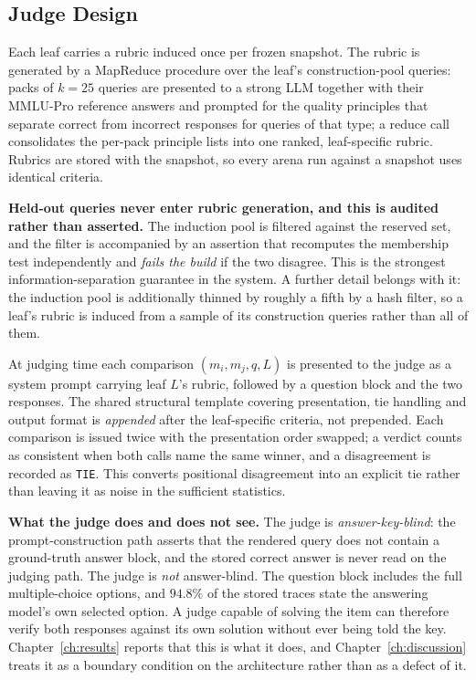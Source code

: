 \subsection{Judge Design}\label{sec:arch-judge}

Each leaf carries a rubric induced once per frozen snapshot. The
rubric is generated by a MapReduce procedure over the leaf's
construction-pool queries: packs of $k = 25$ queries are presented to a
strong LLM together with their MMLU-Pro reference answers and prompted
for the quality principles that separate correct from incorrect
responses for queries of that type; a reduce call consolidates the
per-pack principle lists into one ranked, leaf-specific rubric.
Rubrics are stored with the snapshot, so every arena run against a
snapshot uses identical criteria.

\textbf{Held-out queries never enter rubric generation, and this is
audited rather than asserted.} The induction pool is filtered against
the reserved set, and the filter is accompanied by an assertion that
recomputes the membership test independently and \emph{fails the build}
if the two disagree. This is the strongest information-separation
guarantee in the system. A further detail belongs with it: the
induction pool is additionally thinned by roughly a fifth by a hash
filter, so a leaf's rubric is induced from a sample of its construction
queries rather than all of them.

At judging time each comparison $(m_i, m_j, q, L)$ is presented to the
judge as a system prompt carrying leaf $L$'s rubric, followed by a
question block and the two responses. The shared structural template
covering presentation, tie handling and output format is
\emph{appended} after the leaf-specific criteria, not prepended.
Each comparison is issued twice with the presentation order swapped; a
verdict counts as consistent when both calls name the same winner, and
a disagreement is recorded as \texttt{TIE}. This converts positional
disagreement into an explicit tie rather than leaving it as noise in
the sufficient statistics.

\textbf{What the judge does and does not see.}
The judge is \emph{answer-key-blind}: the prompt-construction path
asserts that the rendered query does not contain a ground-truth answer
block, and the stored correct answer is never read on the judging path.
The judge is \emph{not} answer-blind. The question block includes the
full multiple-choice options, and $94.8\%$ of the stored traces state
the answering model's own selected option. A judge capable of solving
the item can therefore verify both responses against its own solution
without ever being told the key. Chapter~\ref{ch:results} reports that
this is what it does, and Chapter~\ref{ch:discussion} treats it as a
boundary condition on the architecture rather than as a defect of it.

